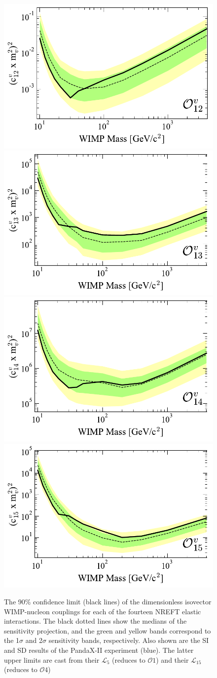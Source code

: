 \documentclass[reprint, showpacs,
preprintnumbers,
amsmath,amssymb,
aps, floatfix,
superscriptaddress,
prd, nofootinbib]{revtex4-1}
\begin{document}
\begin{figure}
    \includegraphics[width=0.5\columnwidth]{SR1_EFT_O12v_c2_lim_Comparison}
    \includegraphics[width=0.5\columnwidth]{SR1_EFT_O13v_c2_lim_Comparison}
    \includegraphics[width=0.5\columnwidth]{SR1_EFT_O14v_c2_lim_Comparison}
    \includegraphics[width=0.5\columnwidth]{SR1_EFT_O15v_c2_lim_Comparison}
    \caption{The 90\% confidence limit (black lines) of the dimensionless isovector WIMP-nucleon couplings for each of the fourteen NREFT elastic interactions.
    The black dotted lines show the medians of the sensitivity projection, and the green and yellow bands correspond to the 1$\sigma$ and 2$\sigma$ sensitivity bands, respectively.
    Also shown are the SI and SD results of the PandaX-II experiment (blue).
    The latter upper limits are cast from their $\mathcal{L}_5$ (reduces to $\mathcal{O}1$) and their $\mathcal{L}_{15}$ (reduces to $\mathcal{O}4$)}
  \label{fig:limits-elastic-v}
\end{figure}
\end{document}
